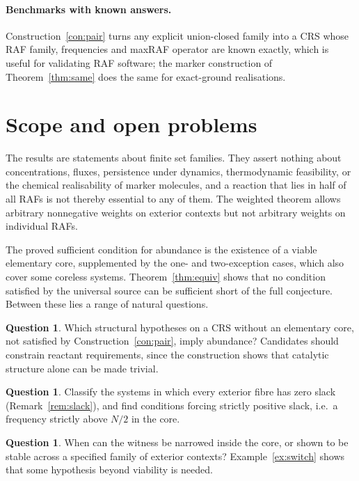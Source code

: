 \documentclass[11pt,a4paper]{article}
\theoremstyle{plain}
\theoremstyle{definition}
\newtheorem{question}[theorem]{Question}
\theoremstyle{remark}
\begin{document}
\paragraph{Benchmarks with known answers.} Construction~\ref{con:pair} turns any explicit
union-closed family into a CRS whose RAF family, frequencies and maxRAF operator are known
exactly, which is useful for validating RAF software; the marker construction of
Theorem~\ref{thm:same} does the same for exact-ground realisations.

\section{Scope and open problems}\label{sec:scope}

The results are statements about finite set families. They assert nothing about
concentrations, fluxes, persistence under dynamics, thermodynamic feasibility, or the
chemical realisability of marker molecules, and a reaction that lies in half of all RAFs is
not thereby essential to any of them. The weighted theorem allows arbitrary nonnegative
weights on exterior contexts but not arbitrary weights on individual RAFs.

The proved sufficient condition for abundance is the existence of a viable elementary core,
supplemented by the one- and two-exception cases, which also cover some coreless systems.
Theorem~\ref{thm:equiv} shows that no condition satisfied by the universal source can be
sufficient short of the full conjecture. Between these lies a range of natural questions.

\begin{question}
Which structural hypotheses on a CRS without an elementary core, not satisfied by
Construction~\ref{con:pair}, imply abundance? Candidates should constrain reactant
requirements, since the construction shows that catalytic structure alone can be made
trivial.
\end{question}

\begin{question}
Classify the systems in which every exterior fibre has zero slack (Remark~\ref{rem:slack}),
and find conditions forcing strictly positive slack, i.e.\ a frequency strictly above $N/2$
in the core.
\end{question}

\begin{question}
When can the witness be narrowed inside the core, or shown to be stable across a specified
family of exterior contexts? Example~\ref{ex:switch} shows that some hypothesis beyond
viability is needed.
\end{question}
\end{document}
